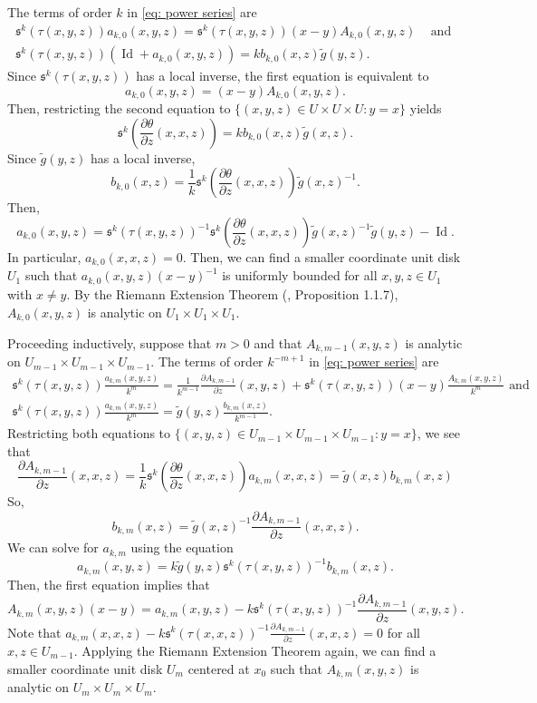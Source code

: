 \documentclass{amsart}
\theoremstyle{definition}
\theoremstyle{remark}
\numberwithin{equation}{section}
\newcommand{\deriv}[2]{\frac{\partial #1}{\partial #2}}
\DeclareMathOperator{\Id}{Id}
\begin{document}
The terms of order $k$ in \eqref{eq: power series} are
\begin{gather*}
\mathfrak{s}^k(\tau(x,y,z)) a_{k,0}(x,y,z)  = \mathfrak{s}^k (\tau(x,y,z))(x-y) A_{k,0}(x,y,z)  \hspace{10pt} \text{ and } \\
\mathfrak{s}^k \left ( \tau(x,y,z) \right )(\Id + a_{k,0}(x,y,z)) =   k b_{k,0}(x,z) \tilde{g}(y,z).
\end{gather*}
Since $\mathfrak{s}^k(\tau(x,y,z))$ has a local inverse, the first equation is equivalent to 
$$
a_{k,0}(x,y,z) = (x-y) A_{k,0}(x,y,z).
$$
Then, restricting the second equation to $\{(x,y,z) \in U\times U \times U: y=x\}$ yields
$$
\mathfrak{s}^k \left ( \deriv{\theta}{z}(x,x,z) \right ) = k  b_{k,0}(x,z) \tilde{g}(x,z).
$$
Since $\tilde{g}(y,z)$ has a local inverse, 
$$
b_{k,0}(x,z) = \frac{1}{k} \mathfrak{s}^k\left ( \deriv{\theta}{z}(x,x,z) \right ) \tilde{g}(x,z)^{-1}.
$$
Then,
$$
a_{k,0}(x,y,z) =  \mathfrak{s}^k \left ( \tau(x,y,z) \right )^{-1} \mathfrak{s}^k\left ( \deriv{\theta}{z}(x,x,z) \right ) \tilde{g}(x,z)^{-1} \tilde{g}(y,z)  - \Id.
$$
In particular, $a_{k,0}(x,x,z) = 0$. Then, we can find a smaller coordinate unit disk $U_1$ such that $a_{k,0}(x,y,z)(x-y)^{-1}$ is uniformly bounded for all $x,y,z \in U_1$ with $x \neq y$. By the Riemann Extension Theorem (\cite{H}, Proposition 1.1.7), $A_{k,0}(x,y,z)$ is analytic on $U_1 \times U_1 \times U_1$.


Proceeding inductively, suppose that $m > 0$ and that $A_{k,m-1}(x,y,z)$ is analytic on $U_{m-1} \times U_{m-1} \times U_{m-1}$. The terms of order $k^{-m+1}$ in \eqref{eq: power series} are
\begin{gather*}
\mathfrak{s}^k(\tau(x,y,z)) \frac{a_{k,m}(x,y,z)}{k^m}  = \frac{1}{k^{m-1}}\deriv{A_{k,m-1}}{z}(x,y,z) + \mathfrak{s}^k (\tau(x,y,z))(x-y) \frac{A_{k,m}(x,y,z)}{k^m} \text{ and } \\
\mathfrak{s}^k \left ( \tau(x,y,z) \right ) \frac{a_{k,m}(x,y,z)}{k^m} =  \tilde{g}(y,z) \frac{b_{k,m}(x,z)}{k^{m-1}} .
\end{gather*}
Restricting both equations to $\{(x,y,z)\in U_{m-1} \times U_{m-1} \times U_{m-1} : y=x\}$, we see that
$$
\deriv{A_{k,m-1}}{z}(x,x,z) = \frac{1}{k}\mathfrak{s}^k \left ( \deriv{\theta}{z}(x,x,z) \right ) a_{k,m}(x,x,z) =\tilde{g}(x,z) b_{k,m}(x,z)
$$
So, 
$$
b_{k,m}(x,z) = \tilde{g}(x,z)^{-1} \deriv{A_{k,m-1}}{z}(x,x,z).
$$
We can solve for $a_{k,m}$ using the equation
$$
a_{k,m}(x,y,z) =  k \tilde{g}(y,z) \mathfrak{s}^k \left ( \tau(x,y,z) \right )^{-1} b_{k,m}(x,z).
$$
Then, the first equation implies that
$$
A_{k,m}(x,y,z)(x-y) =  a_{k,m}(x,y,z)  - k\mathfrak{s}^k \left ( \tau(x,y,z) \right )^{-1} \deriv{A_{k,m-1}}{z}(x,y,z).
$$
Note that $a_{k,m}(x,x,z) - k\mathfrak{s}^k(\tau(x,x,z))^{-1} \deriv{A_{k,m-1}}{z}(x,x,z) = 0$ for all $x,z \in U_{m-1}$. Applying the Riemann Extension Theorem again, we can find a smaller coordinate unit disk $U_m$ centered at $x_0$ such that $A_{k,m}(x,y,z)$ is analytic on $U_m \times U_m \times U_m$. 
\end{document}
